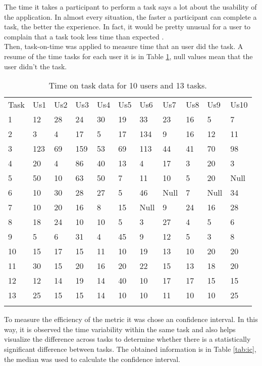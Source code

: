 The time it takes a participant to perform a task says a lot about the usability
of the application. In almost every situation, the faster a participant can
complete a task, the better the experience. In fact, it would be pretty unusual
for a user to complain that a task took less time than expected
\cite{albert2013measuring}.\\ Then, task-on-time was applied to measure time
that an user did the task. A resume of the time tasks for each user it is in
Table \ref{tab:datausers}, null values mean that the user didn't the task.


\begin{table}
\centering
\caption{Time on task data for 10 users and 13 tasks. }
\label{tab:datausers}  
\begin{tabular}{lllllllllll}
\hline\noalign{\smallskip}
Task  & Us1  & Us2 & Us3 & Us4 & Us5 & Us6 & Us7 & Us8 & Us9 & Us10 \\
\noalign{\smallskip}\hline\noalign{\smallskip}
1 & 12  & 28 & 24 & 30 & 19 & 33  & 23 & 16 & 5  & 7 \\
2 & 3   & 4  & 17 & 5  & 17 & 134 & 9  & 16 & 12 & 11 \\
3 & 123 & 69 & 159& 53 & 69 & 113 & 44 & 41 & 70 & 98 \\
4 & 20  & 4  & 86 & 40 & 13 & 4   & 17 & 3  & 20 & 3 \\
5 & 50  & 10 & 63 & 50 & 7  & 11  & 10 & 5  & 20 & Null \\
6 & 10  & 30 & 28 & 27 & 5  & 46  & Null  & 7  & Null  & 34 \\
7 & 10  & 20 & 16 & 8  & 15 & Null   & 9  & 24 & 16 & 28 \\
8 & 18  & 24 & 10 & 10 & 5  & 3   & 27 & 4  & 5  & 6 \\
9 & 5   & 6  & 31 & 4  & 45 & 9   & 12 & 5  & 3  & 8 \\
10 & 15 & 17 & 15 & 11 & 10 & 19  & 13 & 10 & 20 & 20 \\
11 & 30 & 15 & 20 & 16 & 20 & 22  & 15 & 13 & 18 & 20 \\
12 & 12 & 14 & 19 & 14 & 40 & 10  & 17 & 17 & 15 & 15 \\
13 & 25 & 15 & 15 & 14 & 10 & 10  & 11 & 10 & 10 & 25 \\

\noalign{\smallskip}\hline
\end{tabular}
\end{table}

To measure the efficiency of the metric it was chose an confidence interval.  In
this way, it is observed the time variability within the same task and  also
helps visualize the difference across tasks to determine whether there is a
statistically significant difference between tasks. The obtained information is
in Table \ref{tab:ic}, the median was used to calculate the confidence interval.

